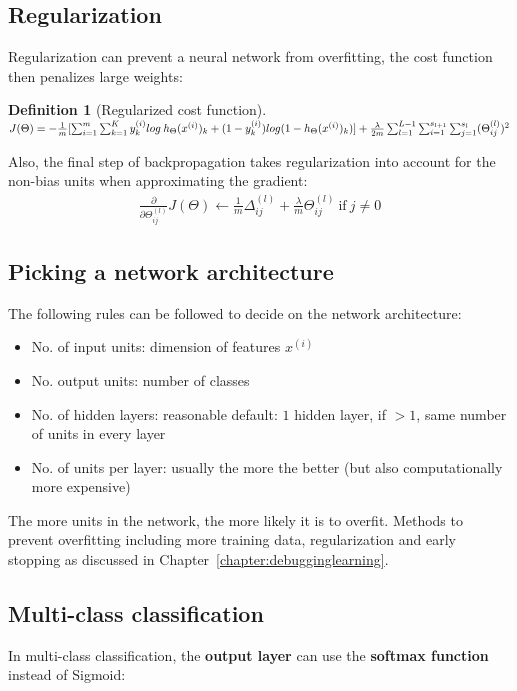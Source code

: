 \documentclass{report}
\newtheorem{definition}{Definition}[section]
\begin{document}
\subsection{Regularization}
Regularization can prevent a neural network from overfitting, the cost function then penalizes large weights:

\begin{definition}[Regularized cost function] ~\\
$J(\Theta) = -\frac{1}{m}[\sum_{i=1}^m \sum_{k=1}^K y_k^{(i)}log\:h_{\Theta}(x^{(i)})_k+(1-y_k^{(i)})log(1-h_{\Theta}(x^{(i)})_k)] \\
+ \frac{\lambda}{2m}\sum_{l=1}^{L-1}\sum_{i=1}^{s_{l+1}}\sum_{j=1}^{s_{l}}(\Theta_{ij}^{(l)})^2$
\end{definition}

Also, the final step of backpropagation takes regularization into account for the non-bias units when approximating the gradient:
\begin{align*}
\frac{\partial}{\partial \Theta_{ij}^{(l)}}J(\Theta) \gets \frac{1}{m}\Delta_{ij}^{(l)}+\frac{\lambda}{m}\Theta_{ij}^{(l)}\:\mbox{if}\:j\ne0
\end{align*}


\subsection{Picking a network architecture}
The following rules can be followed to decide on the network architecture:
\begin{itemize}
\item No. of input units: dimension of features $x^{(i)}$
\item No. output units: number of classes
\item No. of hidden layers: reasonable default: $1$ hidden layer, if $>1$, same number of units in every layer
\item No. of units per layer: usually the more the better (but also computationally more expensive)
\end{itemize}
The more units in the network, the more likely it is to overfit.
Methods to prevent overfitting including more training data, regularization and early stopping as discussed in Chapter~\ref{chapter:debugginglearning}.


\subsection{Multi-class classification}
In multi-class classification, the {\bf output layer} can use the {\bf softmax function} instead of Sigmoid:
\end{document}
